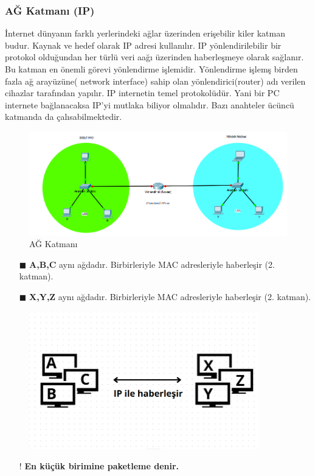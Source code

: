 \subsubsection{AĞ Katmanı (IP) }
İnternet dünyanın farklı yerlerindeki ağlar üzerinden erişebilir kiler katman budur.
Kaynak ve hedef olarak IP adresi kullanılır.
IP yönlendirilebilir bir protokol olduğundan her türlü veri aağı üzerinden haberleşmeye olarak sağlanır.
Bu katman en önemli görevi yönlendirme işlemidir.
Yönlendirme işlemş birden fazla ağ arayüzüne( network interface) sahip olan yönlendirici(router) adı verilen cihazlar tarafından yapılır.
IP internetin temel protokolüdür.
Yani bir PC internete bağlanacaksa IP'yi mutlaka biliyor olmalıdır.
	Bazı anahteler ücüncü katmanda da çalısabilmektedir.
\begin{figure}[!ht]
	\includegraphics[width=15cm]{images/ip_katman}
	\caption{AĞ Katmanı}
	\label{fig:exemple_for_network_model}
\end{figure}
\begin{enumerate}
	\item[$\blacksquare$] \textbf{A,B,C} aynı ağdadır. Birbirleriyle MAC  adresleriyle haberleşir (2. katman).
	\item[$\blacksquare$] \textbf{X,Y,Z} aynı ağdadır. Birbirleriyle MAC  adresleriyle haberleşir (2. katman).
\end{enumerate}
\begin{figure}[!ht]
	\centering
	\includegraphics[width=10cm]{images/ip_communication}
	\label{fig:exemple_for_ip_communication}
\end{figure}
\begin{enumerate}
	\item[!] \textbf{En küçük birimine paketleme denir.}
\end{enumerate}

